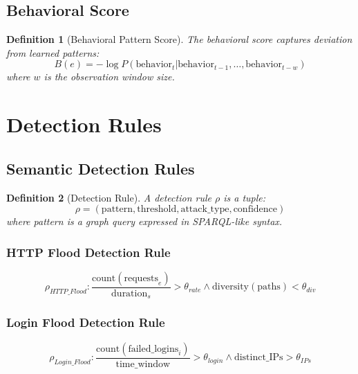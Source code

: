 \documentclass[11pt]{article}
\newtheorem{definition}{Definition}
\begin{document}
\subsection{Behavioral Score}

\begin{definition}[Behavioral Pattern Score]
The behavioral score captures deviation from learned patterns:
\begin{equation}
    B(e) = -\log P(\text{behavior}_t | \text{behavior}_{t-1}, \ldots, \text{behavior}_{t-w})
\end{equation}
where $w$ is the observation window size.
\end{definition}

\section{Detection Rules}

\subsection{Semantic Detection Rules}

\begin{definition}[Detection Rule]
A detection rule $\rho$ is a tuple:
\begin{equation}
    \rho = (\text{pattern}, \text{threshold}, \text{attack\_type}, \text{confidence})
\end{equation}
where pattern is a graph query expressed in SPARQL-like syntax.
\end{definition}

\subsubsection{HTTP Flood Detection Rule}

\begin{equation}
    \rho_{HTTP\_Flood}: \frac{\text{count}(\text{requests}_e)}{\text{duration}_s} > \theta_{rate} \land \text{diversity}(\text{paths}) < \theta_{div}
\end{equation}

\subsubsection{Login Flood Detection Rule}

\begin{equation}
    \rho_{Login\_Flood}: \frac{\text{count}(\text{failed\_logins}_i)}{\text{time\_window}} > \theta_{login} \land \text{distinct\_IPs} > \theta_{IPs}
\end{equation}
\end{document}
